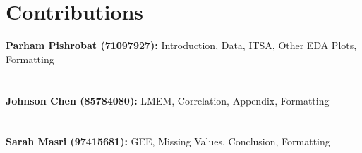 \documentclass[
]{article}
\begin{document}
\pagebreak

\hypertarget{contributions}{%
\section{Contributions}\label{contributions}}

\textbf{Parham Pishrobat (71097927):} Introduction, Data, ITSA, Other EDA Plots, Formatting\\ \\ \\
\textbf{Johnson Chen (85784080):}  \quad LMEM, Correlation, Appendix, Formatting\\ \\ \\
\textbf{Sarah Masri (97415681):} \quad \quad GEE, Missing Values, Conclusion, Formatting\\ \\ \\
\end{document}
